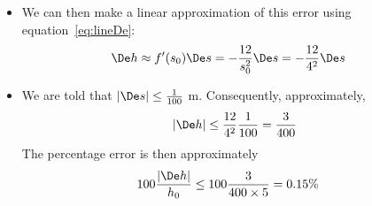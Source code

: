 \begin{eg}
\begin{itemize}
\item We can then make a linear approximation of this error using
equation~\eqref{eq:lineDe}:
\begin{align*}
\De h &\approx f'(s_0)\De s =-\frac{12}{s_0^2}\De s =-\frac{12}{4^2}\De s
\end{align*}
\item We are told that $|\De s|\le\frac{1}{100}$ m. Consequently, approximately,
\begin{align*}
 |\De h|\le \frac{12}{4^2}\frac{1}{100}=\frac{3}{400}
\end{align*}
The percentage error is then approximately
\begin{align*}
  100\frac{|\De h|}{h_0} & \le 100\frac{3}{400\times 5}=0.15\%
\end{align*}
\end{itemize}
\end{eg}

%
%

